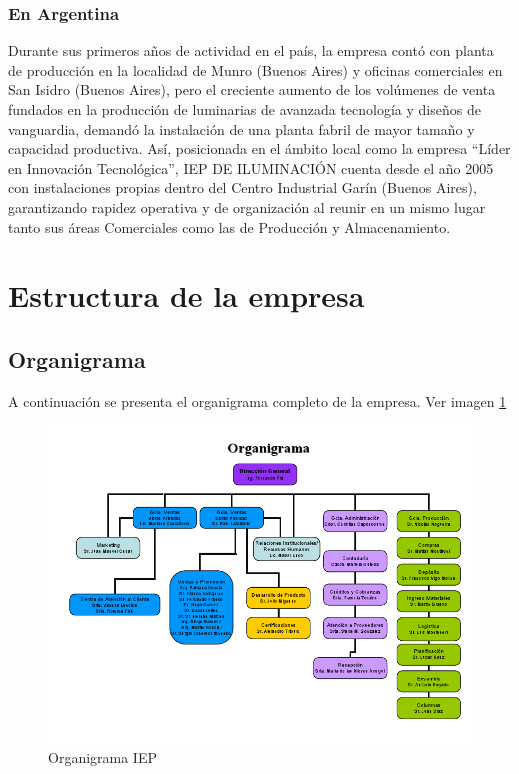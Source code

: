 \subsubsection{En Argentina}
Durante sus primeros años de actividad en el país, la empresa contó con planta de producción en la localidad de Munro (Buenos Aires) y oficinas comerciales en San Isidro (Buenos Aires), pero el creciente aumento de los volúmenes de venta fundados en la producción de luminarias de avanzada tecnología y diseños de vanguardia, demandó la instalación de una planta fabril de mayor tamaño y capacidad productiva.
Así, posicionada en el ámbito local como la empresa “Líder en Innovación Tecnológica”, IEP DE ILUMINACIÓN cuenta desde el año 2005 con instalaciones propias dentro del Centro Industrial Garín (Buenos Aires), garantizando rapidez operativa y de organización al reunir en un mismo lugar tanto sus áreas Comerciales como las de Producción y Almacenamiento.

\section{Estructura de la empresa}

\subsection{Organigrama}
A continuación se presenta el organigrama completo de la empresa. Ver imagen \ref{organigramaIEP}

\begin{figure}[h!]
  \centering
  \includegraphics[scale=0.55]{./Images/organigrama.png}
  \caption{Organigrama IEP}\label{organigramaIEP}
\end{figure}